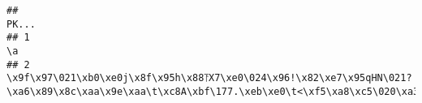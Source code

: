 \documentclass[
]{article}
\begin{document}
\begin{verbatim}
##                                                                                                                                                                                                                                                                                                                                                                                                                                                                                                                                                                                                                                                                                                                                                                                                                                                                                                         PK...
## 1                                                                                                                                                                                                                                                                                                                                                                                                                                                                                                                                                                                                                                                                                                                                                                                                                                                                                                          \a
## 2                                                                                                                                                                                                                                                                                                                                                                                                                                                                                                                                                                                                                                                                                                                                                           \x9f\x97\021\xb0\xe0j\x8f\x95h\x88⥔X7\xe0\024\x96!\x82\xe7\x95qHN\021?\xa6\x89\x8c\xaa\x9e\xaa\t\xc8A\xbf\177.\xeb\xe0\t<\xf5\xa8\xc5\020\xa3\xe1

\end{verbatim}
\end{document}
